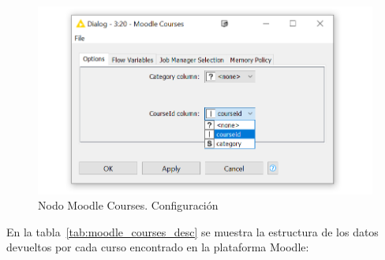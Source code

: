 \begin{figure}[!h]
	\centering
	\includegraphics[width=1\textwidth]{img/nodes_moodle_courses_settings.png}
	\caption{Nodo Moodle Courses. Configuración}
	\label{fig:moodlecourses_settings}
\end{figure}
\FloatBarrier

En la tabla~\ref{tab:moodle_courses_desc} se muestra la estructura de los datos devueltos por cada curso encontrado en la plataforma Moodle: 

